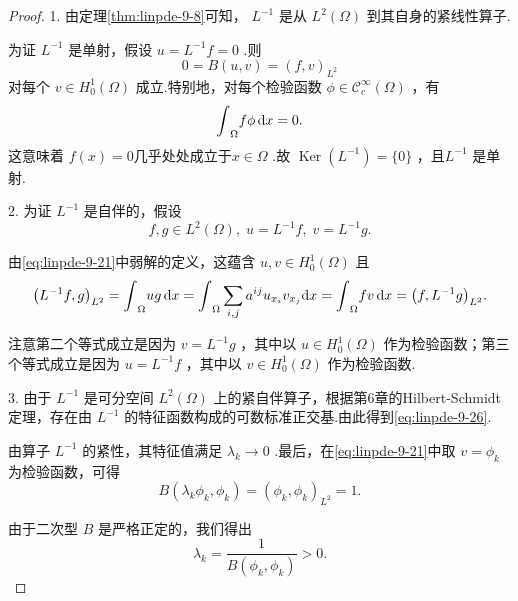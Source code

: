 \begin{proof}
1. 由定理\ref{thm:linpde-9-8}可知， ${L}^{-1}$ 是从 ${L}^{2}\left( \Omega \right)$ 到其自身的紧线性算子.

为证 ${L}^{-1}$ 是单射，假设 $u = {L}^{-1}f = 0$ .则
\[
0 = B\left(  {u,v}\right)   = {\left( f,v\right) }_{{L}^{2}}
\]
对每个 $v \in  {H}_{0}^{1}\left( \Omega \right)$ 成立.特别地，对每个检验函数 $\phi  \in  {\mathcal{C}}_{c}^{\infty }\left( \Omega \right)$ ，有
\[
{\int }_{\Omega }{f\phi \mathop{}\!\mathrm{d} x} = 0.
\]
这意味着 $f\left( x\right)  = 0$几乎处处成立于$x \in  \Omega$ .故 $\operatorname{Ker}\left( {L}^{-1}\right)  = \{ 0\}$ ，且${L}^{-1}$ 是单射.

2. 为证 ${L}^{-1}$ 是自伴的，假设
\[
f,g \in  {L}^{2}\left( \Omega \right) ,\;u = {L}^{-1}f,\;v = {L}^{-1}g.
\]

由\eqref{eq:linpde-9-21}中弱解的定义，这蕴含 $u,v \in  {H}_{0}^{1}\left( \Omega \right)$ 且
\[
{\left( {L}^{-1}f,g\right) }_{{L}^{2}} = {\int }_{\Omega }{ug\mathop{}\!\mathrm{d} x} = {\int }_{\Omega }\sum_{{i,j}}{a}^{ij}{u}_{{x}_{i}}{v}_{{x}_{j}}{\mathop{}\!\mathrm{d} x} = {\int }_{\Omega }{fv\mathop{}\!\mathrm{d} x} = {\left( f,{L}^{-1}g\right) }_{{L}^{2}}.
\]

注意第二个等式成立是因为 $v = {L}^{-1}g$ ，其中以 $u \in  {H}_{0}^{1}\left( \Omega \right)$ 作为检验函数；第三个等式成立是因为 $u = {L}^{-1}f$ ，其中以 $v \in  {H}_{0}^{1}\left( \Omega \right)$ 作为检验函数.

3. 由于 ${L}^{-1}$ 是可分空间 ${L}^{2}\left( \Omega \right)$ 上的紧自伴算子，根据第6章的Hilbert-Schmidt定理，存在由 ${L}^{-1}$ 的特征函数构成的可数标准正交基.由此得到\eqref{eq:linpde-9-26}.

由算子 ${L}^{-1}$ 的紧性，其特征值满足 ${\lambda }_{k} \rightarrow  0$ .最后，在\eqref{eq:linpde-9-21}中取 $v = {\phi }_{k}$ 为检验函数，可得
\[
B\left(  {{\lambda }_{k}{\phi }_{k},{\phi }_{k}}\right)   = {\left( {\phi }_{k},{\phi }_{k}\right) }_{{L}^{2}} = 1.
\]

由于二次型 $B$ 是严格正定的，我们得出
\[
{\lambda }_{k} = \frac{1}{B\left(  {{\phi }_{k},{\phi }_{k}}\right)  } > 0.
\]
\end{proof}

